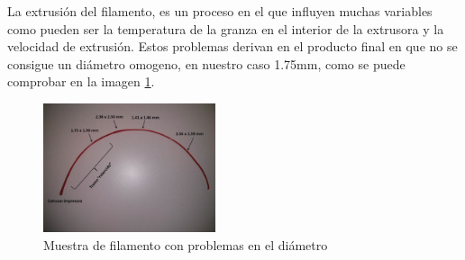 La extrusión del filamento, es un proceso en el que influyen muchas variables como pueden ser la temperatura de la granza en el interior de la extrusora y la velocidad de extrusión. Estos problemas derivan en el producto final en que no se consigue un diámetro omogeno, en nuestro caso 1.75mm, como se puede comprobar en la imagen \ref{fig:muestra_filamento}.

   \begin{figure}[H]
        \centering
        \includegraphics[width=0.45\textwidth]{images/atasco_rojo.jpg}
        \caption{Muestra de filamento con problemas en el diámetro}
        \label{fig:muestra_filamento}
    \end{figure}

